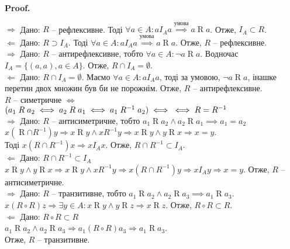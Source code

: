 \documentclass[a4paper, 14pt]{extarticle}
\makeatletter
\def\rightproof{$\boxed{\Rightarrow}$ }
\def\leftproof{$\boxed{\Leftarrow}$ }
\theoremstyle{theoremdd}
\theoremstyle{theoremdd}
\theoremstyle{theoremdd}
\theoremstyle{theoremdd}
\theoremstyle{theoremdd}
\theoremstyle{theoremdd}
\theoremstyle{theoremdd}
\theoremstyle{theoremdd}
\theoremstyle{theoremdd}
\theoremstyle{theoremdd}
\theoremstyle{theoremdd}
\theoremstyle{theoremdd}
\theoremstyle{theoremdd}
\theoremstyle{theoremdd}
\theoremstyle{theoremdd}
\renewenvironment{proof}[1][Proof.\\]{\par
\pushQED{\hfill \qed}%
\normalfont \topsep6\p@\@plus6\p@\relax
\trivlist
\item\relax
{\bfseries
#1\@addpunct{.}}\hspace\labelsep\ignorespaces
}{%
\popQED\endtrivlist\@endpefalse
}
\makeatother
\begin{document}
\begin{proof}
\rightproof Дано: $R$ -- рефлексивне. Тоді $\forall a \in A: a \mathrel{I_A} a \overset{\text{умова}}{\implies} a \mathrel{R} a$. Отже, $I_A \subset R$.\\
\leftproof Дано: $R \supset I_A$. Тоді $\forall a \in A: aI_Aa \overset{\text{умова}}{\implies} a \mathrel{R} a$. Отже, $R$ -- рефлексивне.
\bigskip \\
\rightproof Дано: $R$ -- антирефлексивне, тобто $\forall a \in A: \neg a \mathrel{R}a$. Водночас $I_A = \{(a,a), a \in A \}$. Отже, $R \cap I_A = \emptyset$.\\
\leftproof Дано: $R \cap I_A = \emptyset$. Маємо $\forall a \in A: a \mathrel{I_A} a$, тоді за умовою, $\neg a \mathrel{R} a$, інашке перетин двох множин був би не порожнім. Отже, $R$ -- антирефлексивне.
\bigskip \\
$R$ -- симетричне $\iff$
$(a_1 \mathrel{R} a_2 \iff a_2 \mathrel{R} a_1 \iff a_1 \mathrel{R^{-1}} a_2) \iff \\ \iff R = R^{-1}$
\bigskip \\
\rightproof Дано: $R$ -- антисиметричне, тобто $a_1 \mathrel{R} a_2 \wedge a_2 \mathrel{R} a_1 \implies a_1 = a_2$\\
$x(\mathrel{R} \cap \mathrel{R^{-1}})y \Rightarrow x \mathrel{R} y \wedge x\mathrel{R^{-1}} y \Rightarrow x \mathrel{R} y \wedge y \mathrel{R} x \Rightarrow x=y$.\\
Тоді $x \mathrel{(R \cap R^{-1})} x \Rightarrow x \mathrel{I_A} x$. Отже, $R \cap R^{-1} \subset I_A$.\\
\leftproof Дано: $R \cap R^{-1} \subset I_A$\\
$x \mathrel{R} y \wedge y \mathrel{R} x \Rightarrow x \mathrel{R} y \wedge x \mathrel{R^{-1}} y \Rightarrow x\mathrel{(R \cap R^{-1})}y \Rightarrow x\mathrel{I_A} y \Rightarrow x = y$.
Отже, $R$ -- антисиметричне.
\bigskip \\
\rightproof Дано: $R$ -- транзитивне, тобто $a_1 \mathrel{R} a_2 \wedge a_2 \mathrel{R} a_3 \implies a_1 \mathrel{R} a_3$.\\
$x \mathrel{(R \circ R)} z \Rightarrow \exists y \in A: x \mathrel{R} y \wedge y \mathrel{R} z \Rightarrow x \mathrel{R} z$. Отже, $R \circ R \subset R$.\\
\leftproof Дано: $R \circ R \subset R$\\
$a_1 \mathrel{R} a_2 \wedge a_2 \mathrel{R} a_3 \Rightarrow a_1 \mathrel{(R \circ R)} a_3 \Rightarrow a_1 \mathrel{R} a_3$. \\
Отже, $R$ -- транзитивне.
\end{proof}
\end{document}

